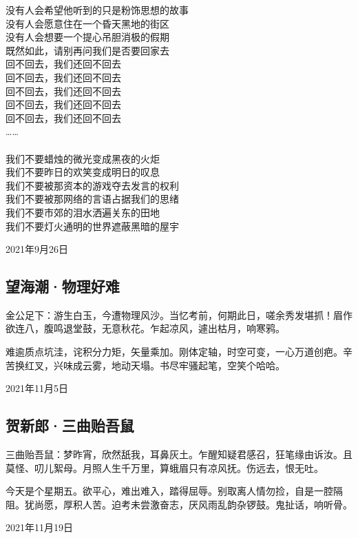 \documentclass[a5paper]{ctexart}
\begin{document}
\begin{center}
		没有人会希望他听到的只是粉饰思想的故事\\
		没有人会愿意住在一个昏天黑地的街区\\
		没有人会想要一个提心吊胆消极的假期\\
		既然如此，请别再问我们是否要回家去\\
		回不回去，我们还回不回去\\
		回不回去，我们还回不回去\\
		回不回去，我们还回不回去\\
		回不回去，我们还回不回去\\
		回不回去，我们还回不回去\\ 
		……\\\hspace*{\fill} \\
		
		我们不要蜡烛的微光变成黑夜的火炬\\
		我们不要昨日的欢笑变成明日的叹息\\
		我们不要被那资本的游戏夺去发言的权利\\
		我们不要被那网络的言语占据我们的思绪\\
		我们不要市郊的泪水洒遍关东的田地\\
		我们不要灯火通明的世界遮蔽黑暗的屋宇
	\end{center}
	\hfill 2021年9月26日
	
	
	\subsection{望海潮·物理好难}
	金公足下：游生白玉，今遭物理风沙。当忆考前，何期此日，嗟余秀发堪抓！眉作欲连八，腹鸣退堂鼓，无意秋花。乍起凉风，遽出枯月，响寒鸦。
	
	难逾质点坑洼，诧积分力矩，矢量乘加。刚体定轴，时空可变，一心万道创疤。辛苦换红叉，兴味成云雾，地动天塌。书尽牢骚起笔，空笑个哈哈。
	\begin{flushright}
		2021年11月5日
	\end{flushright}
	
	\subsection{贺新郎·三曲贻吾鼠}
	三曲贻吾鼠：梦昨宵，欣然舐我，耳鼻灰土。乍醒知疑君感召，狂笔缘由诉汝。且莫怪、叨儿絮母。月照人生千万里，算蛾眉只有凉风抚。伤远去，恨无吐。
	
	今天是个星期五。欲平心，难出难入，踏得屈辱。别取离人情勿捡，自是一腔隔阻。犹尚愿，厚积人苦。迫考未尝激奋志，厌风雨乱韵杂锣鼓。鬼扯话，响听骨。
	\begin{flushright}
		2021年11月19日
	\end{flushright}
	
\end{document}
